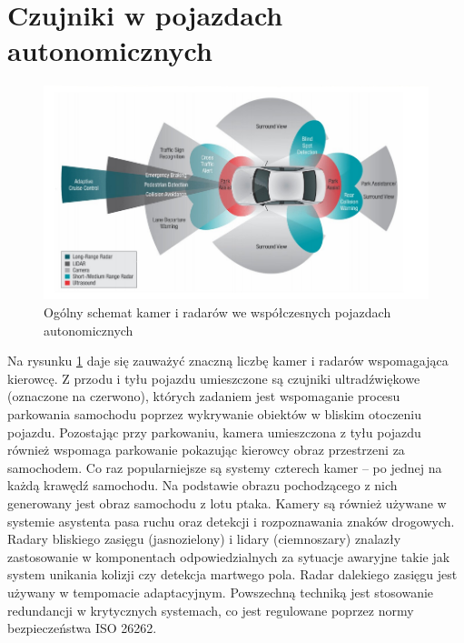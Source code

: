 
\section{Czujniki w pojazdach autonomicznych}

\begin{figure}
  \centering
  \includegraphics[width=13cm]{img/systemy_autonomiczne_ogolnie.png}
  \caption{Ogólny schemat kamer i radarów we współczesnych pojazdach autonomicznych\cite{S1}}
  \label{fig:kamery_i_radary}
\end{figure}

Na rysunku \ref{fig:kamery_i_radary} daje się zauważyć znaczną liczbę kamer i radarów wspomagająca kierowcę. 
Z przodu i tyłu pojazdu umieszczone są czujniki ultradźwiękowe (oznaczone na czerwono), których zadaniem jest wspomaganie procesu parkowania samochodu poprzez wykrywanie obiektów w bliskim otoczeniu pojazdu.
Pozostając przy parkowaniu, kamera umieszczona z tyłu pojazdu również wspomaga parkowanie pokazując kierowcy obraz przestrzeni za samochodem. 
Co raz popularniejsze są systemy czterech kamer -- po jednej na każdą krawędź samochodu. 
Na podstawie obrazu pochodzącego z nich generowany jest obraz samochodu z lotu ptaka.
Kamery są również używane w systemie asystenta pasa ruchu oraz detekcji i rozpoznawania znaków drogowych.
Radary bliskiego zasięgu (jasnozielony) i lidary (ciemnoszary) znalazły zastosowanie w komponentach odpowiedzialnych za sytuacje awaryjne takie jak system unikania kolizji czy detekcja martwego pola.
Radar dalekiego zasięgu jest używany w tempomacie adaptacyjnym.
Powszechną techniką jest stosowanie redundancji w krytycznych systemach, co jest regulowane poprzez normy bezpieczeństwa ISO 26262.

